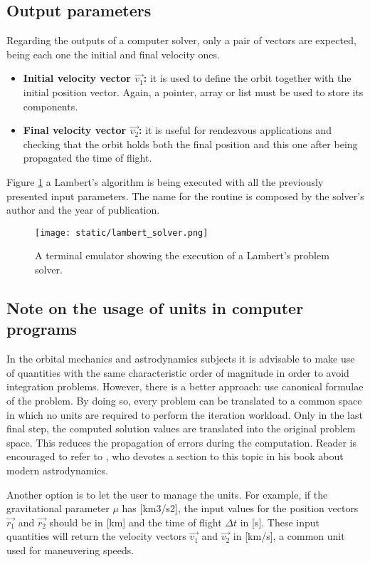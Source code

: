 \subsection{Output parameters}

Regarding the outputs of a computer solver, only a pair of vectors are expected,
being each one the initial and final velocity ones.

\begin{itemize}
  \item \textbf{Initial velocity vector $\vec{v_1}$:} it is used to define the orbit
        together with the initial position vector. Again, a pointer, array or
        list must be used to store its components.
  \item \textbf{Final velocity vector $\vec{v_2}$:} it is useful for rendezvous applications
        and checking that the orbit holds both the final position and this one
        after being propagated the time of flight.
\end{itemize}

Figure \ref{fig:lambert_solver_computer} a Lambert's algorithm is being executed
with all the previously presented input parameters. The name for the routine is
composed by the solver's author and the year of publication.

\begin{figure}[h]
  \centering
  \texttt{[image: static/lambert\_solver.png]}
  \caption{A terminal emulator showing the execution of a Lambert's problem solver.}
  \label{fig:lambert_solver_computer}
\end{figure}


\subsection{Note on the usage of units in computer programs}

In the orbital mechanics and astrodynamics subjects it is advisable to make use
of quantities with the same characteristic order of magnitude in order to avoid
integration problems. However, there is a better approach: use canonical
formulae of the problem. By doing so, every problem can be translated to a
common space in which no units are required to perform the iteration workload.
Only in the last final step, the computed solution values are translated into
the original problem space. This reduces the propagation of errors during the
computation. Reader is encouraged to refer to \cite{wiesel2010}, who devotes a
section to this topic in his book about modern astrodynamics.

Another option is to let the user to manage the units. For example, if the
gravitational parameter $\mu$ has [km3/s2], the input values for the position
vectors $\vec{r_1}$ and $\vec{r_2}$ should be in [km] and the time of flight
$\Delta t$ in [s]. These input quantities will return the velocity vectors
$\vec{v_1}$ and $\vec{v_2}$ in [km/s], a common unit used for maneuvering
speeds.
